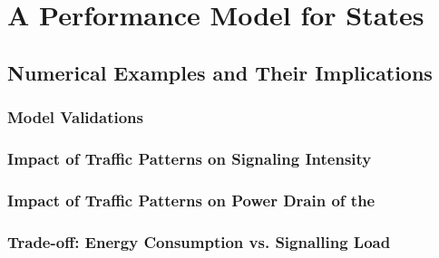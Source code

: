 \section{A Performance Model for   States}\label{sec:network:performance_model}
\cite{Schwartz2013c}



\subsection{Numerical Examples and Their Implications}\label{sec:network:performance_model:numerical_examples}
\subsubsection*{Model Validations}\label{sec:network:performance_model:validations}
\subsubsection*{Impact of Traffic Patterns on Signaling Intensity}\label{sec:network:performance_model:signaling_intensity}
\subsubsection*{Impact of Traffic Patterns on Power Drain of the }\label{sec:network:performance_model:power_drain}
\subsubsection*{Trade-off: Energy Consumption vs. Signalling Load}\label{sec:network:performance_model:trade_off}
